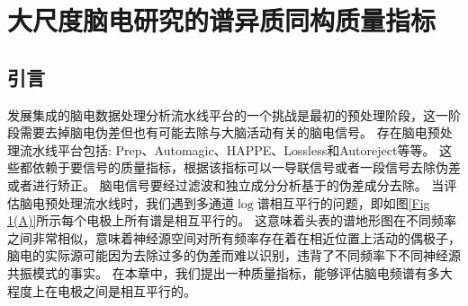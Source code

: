 \chapter{大尺度脑电研究的谱异质同构质量指标}

\section{引言}
发展集成的脑电数据处理分析流水线平台的一个挑战是最初的预处理阶段，这一阶段需要去掉脑电伪差但也有可能去除与大脑活动有关的脑电信号。 存在脑电预处理流水线平台包括: Prep、Automagic、HAPPE、Lossless和Autoreject等等。 这些都依赖于要信号的质量指标，根据该指标可以一导联信号或者一段信号去除伪差或者进行矫正。 脑电信号要经过滤波和独立成分分析基于的伪差成分去除。 当评估脑电预处理流水线时，我们遇到多通道$\log$谱相互平行的问题，即如图\ref{Fig 1(A)}所示每个电极上所有谱是相互平行的。 这意味着头表的谱地形图在不同频率之间非常相似，意味着神经源空间对所有频率存在着在相近位置上活动的偶极子，脑电的实际源可能因为去除过多的伪差而难以识别，违背了不同频率下不同神经源共振模式的事实。 在本章中，我们提出一种质量指标，能够评估脑电频谱有多大程度上在电极之间是相互平行的。

